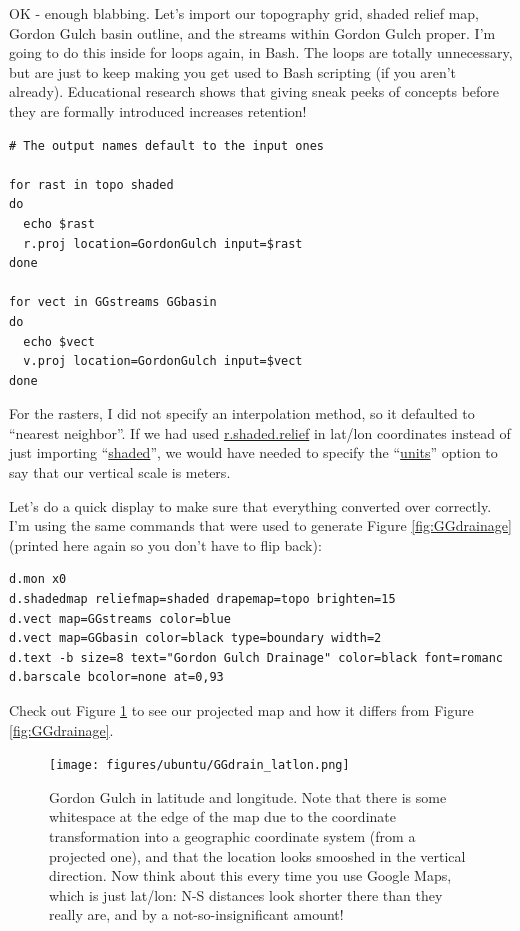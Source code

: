 \documentclass{book}
\begin{document}
OK - enough blabbing. Let's import our topography grid, shaded relief map, Gordon Gulch basin outline, and the streams within Gordon Gulch proper. I'm going to do this inside for loops again, in Bash. The loops are totally unnecessary, but are just to keep making you get used to Bash scripting (if you aren't already). Educational research shows that giving sneak peeks of concepts before they are formally introduced increases retention!
\begin{lstlisting}
# The output names default to the input ones

for rast in topo shaded
do
  echo $rast
  r.proj location=GordonGulch input=$rast
done

for vect in GGstreams GGbasin
do
  echo $vect
  v.proj location=GordonGulch input=$vect
done
\end{lstlisting}
For the rasters, I did not specify an interpolation method, so it defaulted to ``nearest neighbor''. If we had used \url{r.shaded.relief} in lat/lon coordinates instead of just importing ``\url{shaded}'', we would have needed to specify the ``\url{units}'' option to say that our vertical scale is meters.

Let's do a quick display to make sure that everything converted over correctly. I'm using the same commands that were used to generate Figure \ref{fig:GGdrainage} (printed here again so you don't have to flip back):
\begin{lstlisting}
d.mon x0
d.shadedmap reliefmap=shaded drapemap=topo brighten=15
d.vect map=GGstreams color=blue
d.vect map=GGbasin color=black type=boundary width=2
d.text -b size=8 text="Gordon Gulch Drainage" color=black font=romanc
d.barscale bcolor=none at=0,93
\end{lstlisting}
Check out Figure \ref{fig:GGdrain_latlon} to see our projected map and how it differs from Figure \ref{fig:GGdrainage}.

\begin{figure}[h]
 \begin{center}
 \texttt{[image: figures/ubuntu/GGdrain\_latlon.png]}
 \caption{Gordon Gulch in latitude and longitude. Note that there is some whitespace at the edge of the map due to the coordinate transformation into a geographic coordinate system (from a projected one), and that the location looks smooshed in the vertical direction. Now think about this every time you use Google Maps, which is just lat/lon: N-S distances look shorter there than they really are, and by a not-so-insignificant amount!}
 \label{fig:GGdrain_latlon}
 \end{center}
\end{figure}
\end{document}
